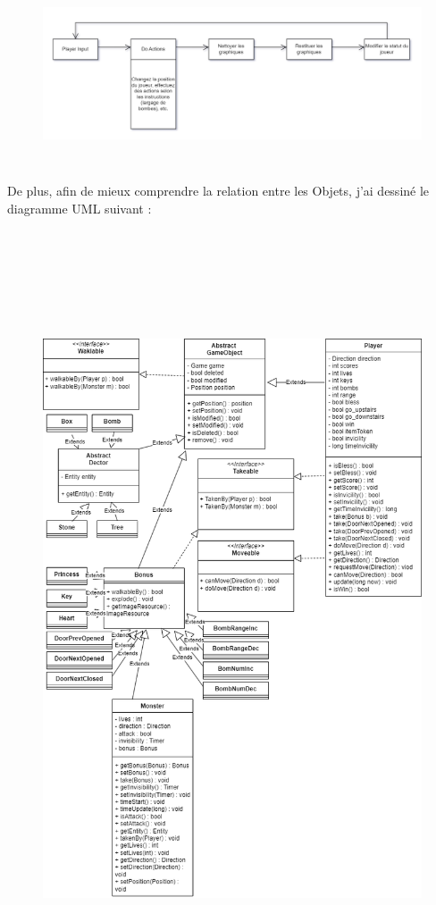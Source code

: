 \documentclass[11pt,english]{article}
\begin{document}
\begin{figure}[htbp]
    \begin{center}
        \includegraphics[height=5.5cm]{./src/cycle.png}
    \end{center}
\end{figure}

\indent De plus, afin de mieux comprendre la relation entre les Objets, j'ai dessiné le diagramme UML suivant :

\begin{figure}[H]
    \begin{center}
        \includegraphics[height = 23cm]{./src/UML_Class.png}
    \end{center}
\end{figure}
\end{document}
